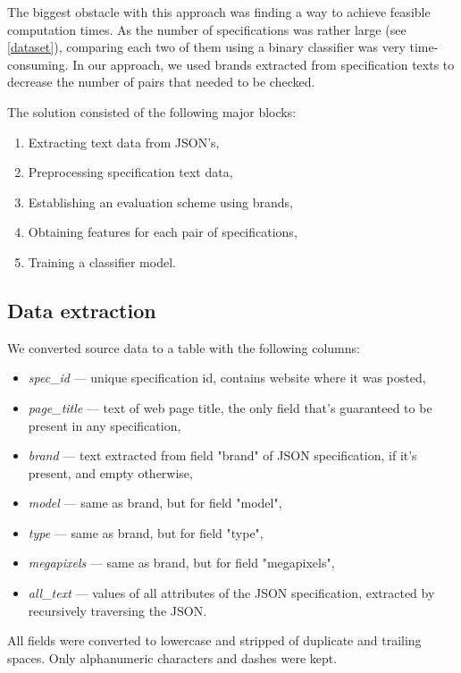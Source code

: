 \documentclass[sigconf]{acmart}
\begin{document}
The biggest obstacle with this approach was finding a way to achieve feasible computation times. As the number of specifications was rather large (see \ref{dataset}), comparing each two of them using a binary classifier was very time-consuming. In our approach, we used brands extracted from specification texts to decrease the number of pairs that needed to be checked.

The solution consisted of the following major blocks:
\begin{enumerate}
\item Extracting text data from JSON's,
\item Preprocessing specification text data,
\item Establishing an evaluation scheme using brands,
\item Obtaining features for each pair of specifications,
\item Training a classifier model.
\end{enumerate}

\subsection{Data extraction}

We converted source data to a table with the following columns:

\begin{itemize}
\item \textit{spec\_id} — unique specification id, contains website where it was posted,
\item \textit{page\_title} — text of web page title, the only field that's guaranteed to be present in any specification,
\item \textit{brand} — text extracted from field "brand" of JSON specification, if it's present, and empty otherwise,
\item \textit{model} — same as brand, but for field "model",  
\item \textit{type} — same as brand, but for field "type",  
\item \textit{megapixels} — same as brand, but for field "megapixels",  
\item \textit{all\_text} — values of all attributes of the JSON specification, extracted by recursively traversing the JSON.
\end{itemize}

All fields were converted to lowercase and stripped of duplicate and trailing spaces. Only alphanumeric characters and dashes were kept.
\end{document}
